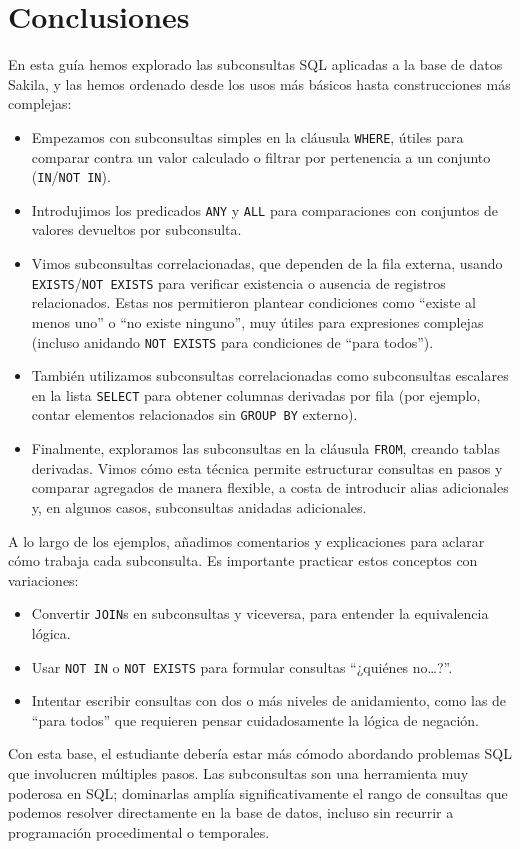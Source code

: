 \documentclass[12pt,a4paper]{article}
\begin{document}
\section*{Conclusiones} En esta guía hemos explorado las subconsultas SQL aplicadas a la base de datos Sakila, y las hemos ordenado desde los usos más básicos hasta construcciones más complejas:



\begin{itemize}
\item Empezamos con subconsultas simples en la cláusula \texttt{WHERE}, útiles para comparar contra un valor calculado o filtrar por pertenencia a un conjunto (\texttt{IN}/\texttt{NOT IN}).
\item Introdujimos los predicados \texttt{ANY} y \texttt{ALL} para comparaciones con conjuntos de valores devueltos por subconsulta.
\item Vimos subconsultas correlacionadas, que dependen de la fila externa, usando \texttt{EXISTS}/\texttt{NOT EXISTS} para verificar existencia o ausencia de registros relacionados.
%
Estas nos permitieron plantear condiciones como “existe al menos uno” o “no existe ninguno”, muy útiles para expresiones complejas (incluso anidando \texttt{NOT EXISTS} para condiciones de “para todos”).
\item También utilizamos subconsultas correlacionadas como subconsultas escalares en la lista \texttt{SELECT} para obtener columnas derivadas por fila (por ejemplo, contar elementos relacionados sin \texttt{GROUP BY} externo).
\item Finalmente, exploramos las subconsultas en la cláusula \texttt{FROM}, creando tablas derivadas.
%
Vimos cómo esta técnica permite estructurar consultas en pasos y comparar agregados de manera flexible, a costa de introducir alias adicionales y, en algunos casos, subconsultas anidadas adicionales.
\end{itemize} 

A lo largo de los ejemplos, añadimos comentarios y explicaciones para aclarar cómo trabaja cada subconsulta.
%
Es importante practicar estos conceptos con variaciones:



\begin{itemize}
\item Convertir \texttt{JOIN}s en subconsultas y viceversa, para entender la equivalencia lógica.
\item Usar \texttt{NOT IN} o \texttt{NOT EXISTS} para formular consultas “¿quiénes no…?”.
\item Intentar escribir consultas con dos o más niveles de anidamiento, como las de “para todos” que requieren pensar cuidadosamente la lógica de negación.
\end{itemize} Con esta base, el estudiante debería estar más cómodo abordando problemas SQL que involucren múltiples pasos.
%
Las subconsultas son una herramienta muy poderosa en SQL; dominarlas amplía significativamente el rango de consultas que podemos resolver directamente en la base de datos, incluso sin recurrir a programación procedimental o temporales.
\end{document}

